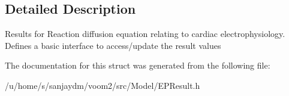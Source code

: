 \subsection{Detailed Description}
Results for Reaction diffusion equation relating to cardiac electrophysiology. Defines a basic interface to access/update the result values 

The documentation for this struct was generated from the following file:\begin{DoxyCompactItemize}
\item 
/u/home/s/sanjaydm/voom2/src/Model/EPResult.h\end{DoxyCompactItemize}
